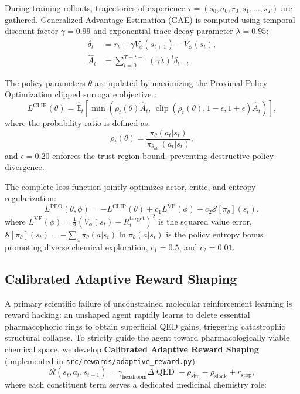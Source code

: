 \documentclass{ieeeaccess}
\begin{document}
During training rollouts, trajectories of experience $\tau = (s_0, a_0, r_0, s_1, \dots, s_T)$ are gathered. Generalized Advantage Estimation (GAE) \cite{schulman2015} is computed using temporal discount factor $\gamma = 0.99$ and exponential trace decay parameter $\lambda = 0.95$:
\begin{align}
\delta_t &= r_t + \gamma V_\phi(s_{t+1}) - V_\phi(s_t), \label{eq:td_residual}\\
\hat{A}_t &= \sum_{l=0}^{T-t-1} (\gamma \lambda)^l \delta_{t+l}. \label{eq:gae_advantage}
\end{align}

The policy parameters $\theta$ are updated by maximizing the Proximal Policy Optimization clipped surrogate objective \cite{schulman2017}:
\begin{equation}
L^{\text{CLIP}}(\theta) = \hat{\mathbb{E}}_t \left[ \min\left( \rho_t(\theta) \hat{A}_t, \, \operatorname{clip}\left(\rho_t(\theta), 1-\epsilon, 1+\epsilon\right) \hat{A}_t \right) \right],
\label{eq:ppo_clip}
\end{equation}
where the probability ratio is defined as:
\begin{equation}
\rho_t(\theta) = \frac{\pi_\theta(a_t | s_t)}{\pi_{\theta_{\text{old}}}(a_t | s_t)},
\label{eq:prob_ratio}
\end{equation}
and $\epsilon = 0.20$ enforces the trust-region bound, preventing destructive policy divergence.

The complete loss function jointly optimizes actor, critic, and entropy regularization:
\begin{equation}
L^{\text{PPO}}(\theta, \phi) = -L^{\text{CLIP}}(\theta) + c_1 L^{\text{VF}}(\phi) - c_2 \mathcal{S}[\pi_\theta](s_t),
\label{eq:total_loss}
\end{equation}
where $L^{\text{VF}}(\phi) = \frac{1}{2} (V_\phi(s_t) - R_t^{\text{target}})^2$ is the squared value error, $\mathcal{S}[\pi_\theta](s_t) = -\sum_{a} \pi_\theta(a|s_t) \ln \pi_\theta(a|s_t)$ is the policy entropy bonus promoting diverse chemical exploration, $c_1 = 0.5$, and $c_2 = 0.01$.

\subsection{Calibrated Adaptive Reward Shaping}
A primary scientific failure of unconstrained molecular reinforcement learning is reward hacking: an unshaped agent rapidly learns to delete essential pharmacophoric rings to obtain superficial QED gains, triggering catastrophic structural collapse. To strictly guide the agent toward pharmacologically viable chemical space, we develop \textbf{Calibrated Adaptive Reward Shaping} (implemented in \texttt{src/rewards/adaptive\_reward.py}):
\begin{equation}
\mathcal{R}(s_t, a_t, s_{t+1}) = \gamma_{\text{headroom}} \Delta\operatorname{QED} - \rho_{\text{sim}} - \rho_{\text{slack}} + r_{\text{stop}},
\label{eq:adaptive_reward_total}
\end{equation}
where each constituent term serves a dedicated medicinal chemistry role:
\end{document}
